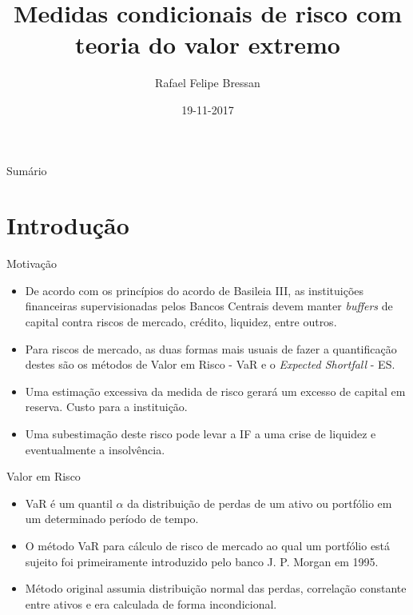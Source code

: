 \documentclass[ignorenonframetext,]{beamer}
\title{Medidas condicionais de risco com teoria do valor extremo}
\author{Rafael Felipe Bressan}
\date{19-11-2017}
\providecommand{\tightlist}{%
\setlength{\itemsep}{0pt}\setlength{\parskip}{0pt}}
\begin{document}
\frame{\titlepage}

\section[]{}
\begin{frame}{Sumário}
  \tableofcontents
\end{frame}

\section{Introdução}\label{introducao}

\begin{frame}{Motivação}

\begin{itemize}
\tightlist
\item
  De acordo com os princípios do acordo de Basileia III, as instituições
  financeiras supervisionadas pelos Bancos Centrais devem manter
  \emph{buffers} de capital contra riscos de mercado, crédito, liquidez,
  entre outros.
\item
  Para riscos de mercado, as duas formas mais usuais de fazer a
  quantificação destes são os métodos de Valor em Risco - VaR e o
  \emph{Expected Shortfall} - ES.
\item
  Uma estimação excessiva da medida de risco gerará um excesso de
  capital em reserva. Custo para a instituição.
\item
  Uma subestimação deste risco pode levar a IF a uma crise de liquidez e
  eventualmente a insolvência.
\end{itemize}

\end{frame}

\begin{frame}{Valor em Risco}

\begin{itemize}
\tightlist
\item
  VaR é um quantil \(\alpha\) da distribuição de perdas de um ativo ou
  portfólio em um determinado período de tempo.
\item
  O método VaR para cálculo de risco de mercado ao qual um portfólio
  está sujeito foi primeiramente introduzido pelo banco J. P. Morgan em
  1995.
\item
  Método original assumia distribuição normal das perdas, correlação
  constante entre ativos e era calculada de forma incondicional.
\end{itemize}

\end{frame}
\end{document}
